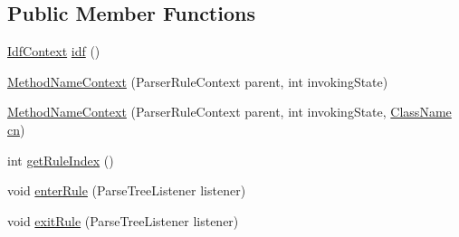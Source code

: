 \subsection*{Public Member Functions}
\begin{DoxyCompactItemize}
\item 
\hyperlink{classgov_1_1nasa_1_1jpf_1_1inspector_1_1server_1_1expression_1_1parser_1_1_expression_grammar_parser_1_1_idf_context}{Idf\+Context} \hyperlink{classgov_1_1nasa_1_1jpf_1_1inspector_1_1server_1_1expression_1_1parser_1_1_expression_grammar_parser_1_1_method_name_context_a6c0e85c751a4bb4e8a4ab42f513dfe78}{idf} ()
\item 
\hyperlink{classgov_1_1nasa_1_1jpf_1_1inspector_1_1server_1_1expression_1_1parser_1_1_expression_grammar_parser_1_1_method_name_context_a7e083d20a01b5c95c2837e450402b91c}{Method\+Name\+Context} (Parser\+Rule\+Context parent, int invoking\+State)
\item 
\hyperlink{classgov_1_1nasa_1_1jpf_1_1inspector_1_1server_1_1expression_1_1parser_1_1_expression_grammar_parser_1_1_method_name_context_ab38ae774d10c504e561fff9f4c842112}{Method\+Name\+Context} (Parser\+Rule\+Context parent, int invoking\+State, \hyperlink{classgov_1_1nasa_1_1jpf_1_1inspector_1_1utils_1_1expressions_1_1_class_name}{Class\+Name} \hyperlink{classgov_1_1nasa_1_1jpf_1_1inspector_1_1server_1_1expression_1_1parser_1_1_expression_grammar_parser_1_1_method_name_context_af75f2150b50379ba93a678da462770c7}{cn})
\item 
int \hyperlink{classgov_1_1nasa_1_1jpf_1_1inspector_1_1server_1_1expression_1_1parser_1_1_expression_grammar_parser_1_1_method_name_context_a940ea89295c0b2d736ca37f47914b20d}{get\+Rule\+Index} ()
\item 
void \hyperlink{classgov_1_1nasa_1_1jpf_1_1inspector_1_1server_1_1expression_1_1parser_1_1_expression_grammar_parser_1_1_method_name_context_a414f8d80cb5d458417c79c9053eff64c}{enter\+Rule} (Parse\+Tree\+Listener listener)
\item 
void \hyperlink{classgov_1_1nasa_1_1jpf_1_1inspector_1_1server_1_1expression_1_1parser_1_1_expression_grammar_parser_1_1_method_name_context_a4ee9238141677aca48a1632cc480d2ba}{exit\+Rule} (Parse\+Tree\+Listener listener)
\end{DoxyCompactItemize}

